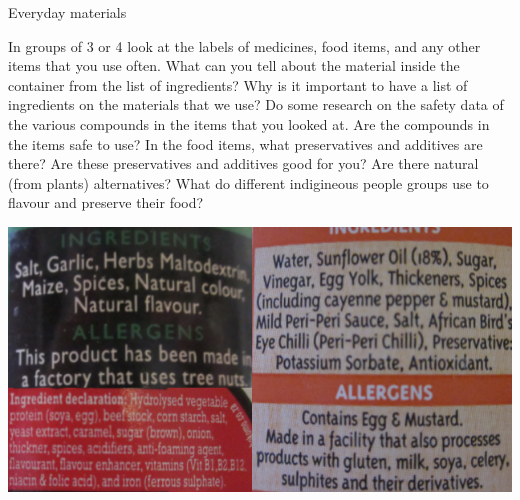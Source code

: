    \label{m38708*eip-344}\begin{activity}{Everyday materials}
{
\begin{minipage}{.5\textwidth}
In groups of 3 or 4 look at the labels of medicines, food items, and any other items that you use often. What can you tell about the material inside the container from the list of ingredients? Why is it important to have a list of ingredients on the materials that we use? Do some research on the safety data of the various compounds in the items that you looked at. Are the compounds in the items safe to use? In the food items, what preservatives and additives are there? Are these preservatives and additives good for you? Are there natural (from plants) alternatives? What do different indigineous people groups use to flavour and preserve their food?
\end{minipage}
\begin{minipage}{.5\textwidth}
 \begin{center}
 \includegraphics[width=.8\textwidth]{photos/food_labels.png}\par
\end{center}
\end{minipage}

 }  \end{activity}\par \label{m38708*cid2}
